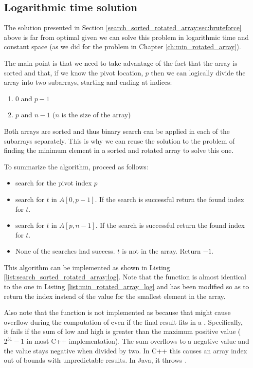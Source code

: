\subsection{Logarithmic time solution}
\label{search_sorted_rotated_array:sec:log}
The solution presented in Section \ref{search_sorted_rotated_array:sec:bruteforce} above is far from optimal given we can solve this problem in logarithmic time and constant space (as we did for the problem in Chapter \ref{ch:min_rotated_array}).

The main point is that we need to take advantage of the fact that the array is sorted and that, if we know the pivot location, $p$ then we can logically divide the array into two subarrays, starting and ending at indices:
\begin{enumerate}
	\item $0$ and $p-1$
	\item $p$ and $n-1$ ($n$ is the size of the array)
\end{enumerate}
Both arrays are sorted and thus binary search can be applied in each of the subarrays separately. This is why we can reuse the solution to the problem of finding the minimum element in a sorted and rotated array to solve this one.

To summarize the algorithm, proceed as follows:
\begin{itemize}
	\item search for the pivot index $p$
	\item search for $t$ in $A[0,p-1]$. If the search is successful return the found index for $t$.
	\item search for $t$ in $A[p,n-1]$.  If the search is successful return the found index for $t$.
	\item None of the searches had success. $t$ is not in the array. Return $-1$.
\end{itemize}

This algorithm can be implemented as shown in Listing \ref{list:search_sorted_rotated_array:log}. Note that the function  is almost identical to the one in Listing \ref{list:min_rotated_array_log} and has been modified so as to return the index instead of the value for the smallest element in the array.

Also note that the function  is not implemented as  because that might cause overflow during the computation of  even if the final result fits in a . Specifically, it fails if the sum of low and high is greater than the maximum positive  value ($2^{31} - 1$ in most C++ implementation). The sum overflows to a negative value and the value stays negative when divided by two. In C++ this causes an array index out of bounds with unpredictable results. In Java, it throws .

